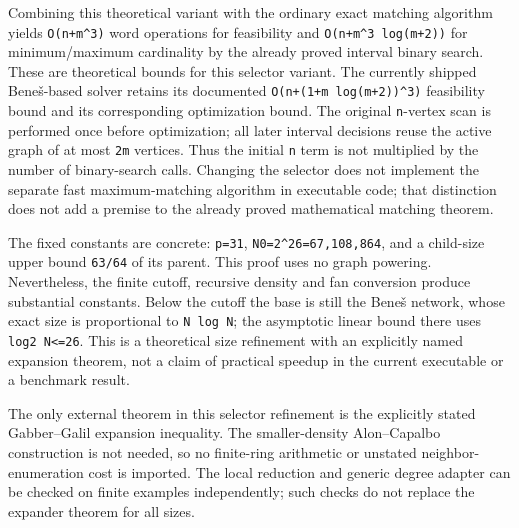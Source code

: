 Combining this theoretical variant with the ordinary exact matching algorithm yields \texttt{O(n+m\^{}3)} word operations for feasibility and \texttt{O(n+m\^{}3\ log(m+2))} for minimum/maximum cardinality by the already proved interval binary search. These are theoretical bounds for this selector variant. The currently shipped Beneš-based solver retains its documented \texttt{O(n+(1+m\ log(m+2))\^{}3)} feasibility bound and its corresponding optimization bound. The original \texttt{n}-vertex scan is performed once before optimization; all later interval decisions reuse the active graph of at most \texttt{2m} vertices. Thus the initial \texttt{n} term is not multiplied by the number of binary-search calls. Changing the selector does not implement the separate fast maximum-matching algorithm in executable code; that distinction does not add a premise to the already proved mathematical matching theorem.

The fixed constants are concrete: \texttt{p=31}, \texttt{N0=2\^{}26=67,108,864}, and a child-size upper bound \texttt{63/64} of its parent. This proof uses no graph powering. Nevertheless, the finite cutoff, recursive density and fan conversion produce substantial constants. Below the cutoff the base is still the Beneš network, whose exact size is proportional to \texttt{N\ log\ N}; the asymptotic linear bound there uses \texttt{log2\ N\textless{}=26}. This is a theoretical size refinement with an explicitly named expansion theorem, not a claim of practical speedup in the current executable or a benchmark result.

The only external theorem in this selector refinement is the explicitly stated Gabber--Galil expansion inequality. The smaller-density Alon--Capalbo construction is not needed, so no finite-ring arithmetic or unstated neighbor-enumeration cost is imported. The local reduction and generic degree adapter can be checked on finite examples independently; such checks do not replace the expander theorem for all sizes.
